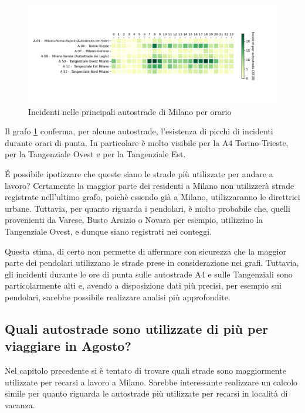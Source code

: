 \documentclass[a4paper,12pt]{report}
\begin{document}
\begin{figure}
    \includegraphics[width=\linewidth]{../src/incidenti/incidenti_aci/orari/tangenziali_autostrade.png}
    \caption{Incidenti nelle principali autostrade di Milano per orario}
    \label{fig:tangenziali-autostrade}
\end{figure}

Il grafo \ref{fig:tangenziali-autostrade} conferma, per alcune autostrade, 
l'esistenza di picchi di incidenti durante orari di punta. 
In particolare è molto visibile per la A4 Torino-Trieste, 
per la Tangenziale Ovest e per la Tangenziale Est.

\'E possibile ipotizzare che queste siano le strade più utilizzate per 
andare a lavoro? 
Certamente la maggior parte dei residenti a Milano non utilizzerà strade registrate 
nell'ultimo grafo, poichè essendo già a Milano, utilizzaranno le direttrici urbane. 
Tuttavia, per quanto riguarda i pendolari, è molto probabile che, quelli provenienti 
da Varese, Busto Arsizio o Novara per esempio, utilizzino la Tangenziale Ovest, 
e dunque siano registrati nei conteggi. 

Questa stima, di certo non permette di affermare con sicurezza 
che la maggior parte dei pendolari utilizzano le strade prese in considerazione 
nei grafi.
Tuttavia, gli incidenti durante le ore di punta sulle autostrade A4 e sulle 
Tangenziali sono particolarmente alti e, avendo a disposizione dati più 
precisi, per esempio sui pendolari, sarebbe possibile realizzare analisi 
più approfondite.

\subsection{Quali autostrade sono utilizzate di più per viaggiare in Agosto?}

Nel capitolo precedente si è tentato di trovare quali strade sono maggiormente 
utilizzate per recarsi a lavoro a Milano. 
Sarebbe interessante realizzare un calcolo simile per quanto riguarda le autostrade 
più utilizzate per recarsi in località di vacanza. 
\end{document}
